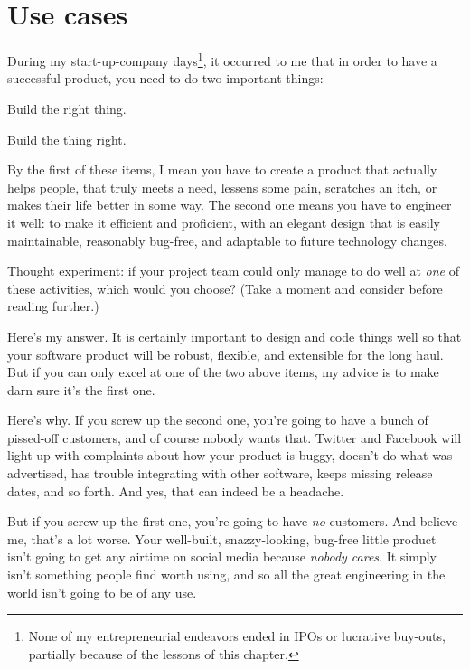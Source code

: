 
\chapter{Use cases}

During my start-up-company days\footnote{None of my entrepreneurial endeavors
ended in IPOs or lucrative buy-outs, partially because of the lessons of this
chapter.}, it occurred to me that in order to have a successful product, you
need to do two important things:

\begin{compactenum}
\item Build the right thing.
\item Build the thing right.
\end{compactenum}

By the first of these items, I mean you have to create a product that actually
helps people, that truly meets a need, lessens some pain, scratches an itch,
or makes their life better in some way. The second one means you have to
engineer it well: to make it efficient and proficient, with an elegant design
that is easily maintainable, reasonably bug-free, and adaptable to future
technology changes.

Thought experiment: if your project team could only manage to do well at
\textit{one} of these activities, which would you choose? (Take a moment and
consider before reading further.)

Here's my answer. It is certainly important to design and code things well so
that your software product will be robust, flexible, and extensible for the
long haul. But if you can only excel at one of the two above items, my advice
is to make darn sure it's the first one.

Here's why. If you screw up the second one, you're going to have a bunch of
pissed-off customers, and of course nobody wants that. Twitter and Facebook
will light up with complaints about how your product is buggy, doesn't do what
was advertised, has trouble integrating with other software, keeps missing
release dates, and so forth. And yes, that can indeed be a headache.

But if you screw up the first one, you're going to have \textit{no} customers.
And believe me, that's a lot worse. Your well-built, snazzy-looking, bug-free
little product isn't going to get any airtime on social media because
\textit{nobody cares}. It simply isn't something people find worth using, and
so all the great engineering in the world isn't going to be of any use.

